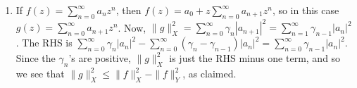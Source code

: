 \documentclass[12pt]{article}
\theoremstyle{definitionstyle}
\newcommand{\mg}[1]{\| #1 \|}
\begin{document}
\begin{enumerate}[leftmargin=\labelsep]
		\begin{align*}
			h(e^{it}) = \frac{e^{it}-a}{1-\overline{a}e^{it}}
		\end{align*}
		Is a monotonically increasing function of $t$ as long as $|a| < 1$. So indeed, as every factor in the Blaschke product 
		\begin{align*}
			\prod_{k=1}^n \frac{z-a_k}{1-\overline{a_k}z}
		\end{align*}
		is of this form, every factor's argument is a monotonically increasing function of $t$. Their product's argument is the sum of their arguments--and one notes that the sum of two monotonically increasing functions is again another monotonically increasing function. Therefore, the entire Blaschke product's argument is a monotonically increasing function, and we are done. $\hfill$ \textbf{Q.E.D.}
		
	
		\item If $f(z) = \sum_{n=0}^\infty a_nz^n$, then $f(z) = a_0 + z\sum_{n=0}^\infty a_{n+1}z^n$, so in this case $g(z) = \sum_{n=0}^\infty a_{n+1}z^n$. Now, $\mg{g}^2_X = \sum_{n=0}^\infty \gamma_n|a_{n+1}|^2 = \sum_{n=1}^\infty \gamma_{n-1}|a_{n}|^2$. The RHS is $\sum_{n=0}^\infty \gamma_n|a_n|^2 - \sum_{n=0}^\infty (\gamma_n-\gamma_{n-1})|a_n|^2 = \sum_{n=0}^\infty \gamma_{n-1}|a_n|^2$. Since the $\gamma_n$'s are positive, $\mg{g}^2_X$ is just the RHS minus one term, and so we see that $\mg{g}^2_X \leq \mg{f}_X^2 - \mg{f}_Y^2$, as claimed.
		

\end{enumerate}
\end{document}
